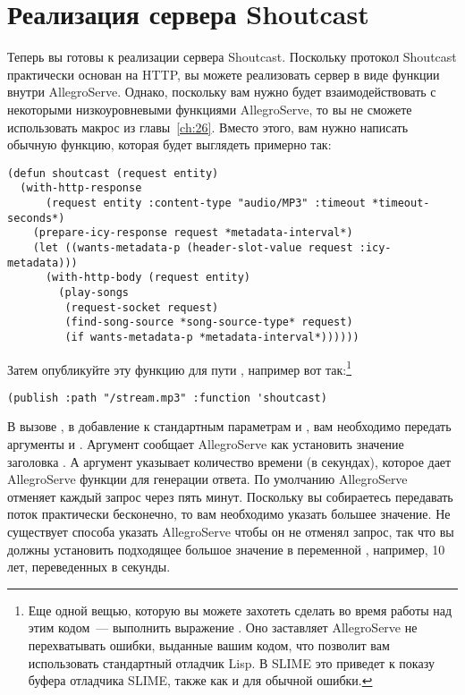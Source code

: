 \section{Реализация сервера Shoutcast}

Теперь вы готовы к реализации сервера Shoutcast. Поскольку протокол Shoutcast практически
основан на HTTP, вы можете реализовать сервер в виде функции внутри AllegroServe.  Однако,
поскольку вам нужно будет взаимодействовать с некоторыми низкоуровневыми функциями
AllegroServe, то вы не сможете использовать макрос  из
главы~\ref{ch:26}. Вместо этого, вам нужно написать обычную функцию, которая будет
выглядеть примерно так:

\begin{lstlisting}
(defun shoutcast (request entity)
  (with-http-response
      (request entity :content-type "audio/MP3" :timeout *timeout-seconds*)
    (prepare-icy-response request *metadata-interval*)
    (let ((wants-metadata-p (header-slot-value request :icy-metadata)))
      (with-http-body (request entity)
        (play-songs 
         (request-socket request)
         (find-song-source *song-source-type* request)
         (if wants-metadata-p *metadata-interval*))))))
\end{lstlisting}

Затем опубликуйте эту функцию для пути , например вот так:\footnote{Еще
  одной вещью, которую вы можете захотеть сделать во время работы над этим кодом~---
  выполнить выражение .  Оно заставляет AllegroServe
  не перехватывать ошибки, выданные вашим кодом, что позволит вам использовать стандартный
  отладчик Lisp.  В SLIME это приведет к показу буфера отладчика SLIME, также как и для
  обычной ошибки.}

\begin{lstlisting}
(publish :path "/stream.mp3" :function 'shoutcast)
\end{lstlisting}

В вызове , в добавление к стандартным параметрам  и
, вам необходимо передать аргументы  и .
Аргумент  сообщает AllegroServe как установить значение заголовка
.  А аргумент  указывает количество времени (в
секундах), которое дает AllegroServe функции для генерации ответа. По умолчанию
AllegroServe отменяет каждый запрос через пять минут.  Поскольку вы собираетесь передавать
поток практически бесконечно, то вам необходимо указать большее значение.  Не существует
способа указать AllegroServe чтобы он не отменял запрос, так что вы должны установить
подходящее большое значение в переменной , например, 10 лет,
переведенных в секунды.

